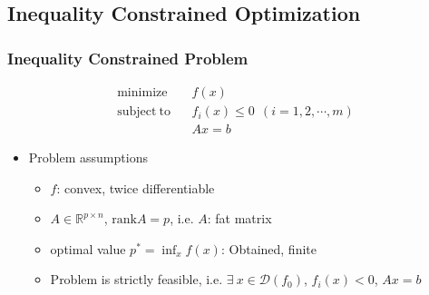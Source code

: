 \subsection{Inequality Constrained Optimization}

\subsubsection*{Inequality Constrained Problem}
$$ \begin{aligned}
    \mathrm{minimize}~~&~~f(x) \\
    \mathrm{subject~to}~~&~~f_i(x)\leq 0~~(i=1,2,\cdots,m) \\
        &~~Ax=b
\end{aligned} $$
\begin{itemize}
    \item Problem assumptions
    \begin{itemize}
        \item $f$: convex, twice differentiable
        \item $A\in\mathbb{R}^{p\times n}$, $\mathrm{rank}A=p$, i.e. $A$: fat matrix
        \item optimal value $p^\ast = \inf_x f(x)$: Obtained, finite
        \item Problem is strictly feasible, i.e. $\exists~x\in\mathcal{D}(f_0)$, $f_i(x)<0$, $Ax=b$
    \end{itemize}
\end{itemize}

